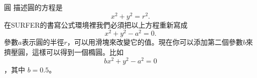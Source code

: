 \begin{surferPage}{圓}
描述圓的方程是
\[x^2+y^2=r^2.\]
在SURFER的書寫公式環境裡我們必須把以上方程重新寫成
\[x^2+y^2-a^2=0.\]
參數$a$表示圓的半徑$r$，可以用滑塊來改變它的值。現在你可以添加第二個參數$b$來擠壓圓，這樣可以得到一個橢圓。比如
\[bx^2+y^2-a^2=0\]，其中 $b=0.5$。
\end{surferPage}

